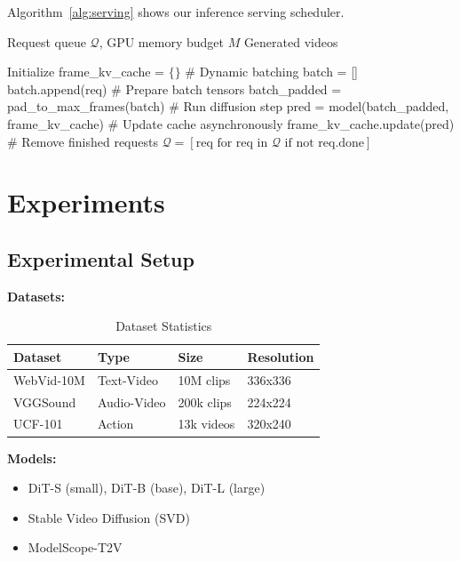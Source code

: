 \documentclass[journal]{IEEEtran}
\theoremstyle{definition}
\theoremstyle{remark}
\begin{document}
Algorithm~\ref{alg:serving} shows our inference serving scheduler.

\begin{algorithm}[t]
\caption{Continuous Batching for Video Diffusion}
\label{alg:serving}
\begin{algorithmic}[1]
\REQUIRE Request queue $\mathcal{Q}$, GPU memory budget $M$
\ENSURE Generated videos

\STATE Initialize frame\_kv\_cache = $\{\}$
    \STATE \# Dynamic batching
    \STATE batch = []
            \STATE batch.append(req)
        \ENDIF
    \ENDFOR
    \STATE \# Prepare batch tensors
    \STATE batch\_padded = pad\_to\_max\_frames(batch)
    \STATE \# Run diffusion step
    \STATE pred = model(batch\_padded, frame\_kv\_cache)
    \STATE \# Update cache asynchronously
    \STATE frame\_kv\_cache.update(pred)
    \STATE \# Remove finished requests
    \STATE $\mathcal{Q} = [\text{req for req in }\mathcal{Q}\text{ if not req.done}]$
\ENDWHILE
\end{algorithmic}
\end{algorithm}

\section{Experiments}
\label{sec:experiments}

\subsection{Experimental Setup}

\textbf{Datasets:}

\begin{table}[ht]
\centering
\caption{Dataset Statistics}
\label{tab:datasets}
\begin{tabular}{llll}
\toprule
Dataset & Type & Size & Resolution \\
\midrule
WebVid-10M & Text-Video & 10M clips & 336x336 \\
VGGSound & Audio-Video & 200k clips & 224x224 \\
UCF-101 & Action & 13k videos & 320x240 \\
\bottomrule
\end{tabular}
\end{table}

\textbf{Models:}
\begin{itemize}
    \item DiT-S (small), DiT-B (base), DiT-L (large) \cite{peebles2023scalable}
    \item Stable Video Diffusion (SVD) \cite{stability2023svd}
    \item ModelScope-T2V \cite{wang2023modelscope}
\end{itemize}
\end{document}
